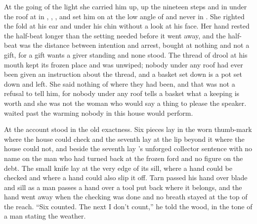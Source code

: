 At the going of the light she carried him up, up the nineteen steps and in under the roof at  in , , , and set him on  at the low angle of  and never in . She righted the fold at his ear and under his chin without a look at his face. Her hand rested the half-beat longer than the setting needed before it went away, and the half-beat was the distance between intention and arrest, bought at nothing and not a gift, for a gift wants a giver standing and none stood. The thread of drool at his mouth kept its frozen place and was unwiped; nobody under any roof had ever been given an instruction about the thread, and a basket set down is a pot set down and left. She said nothing of where they had been, and that was not a refusal to tell him, for nobody under any roof tells a basket what a keeping is worth and she was not the woman who would say a thing to please the speaker.  waited past the warming nobody in this house would perform.

\scenebreak

At  the account stood in the old exactness. Six pieces lay in the worn thumb-mark where the house could check and the seventh lay at the lip beyond it where the house could not, and beside the seventh lay 's unforged collector sentence with no name on the man who had turned back at the frozen ford and no figure on the debt. The small knife lay at the very edge of its sill, where a hand could be checked and where a hand could also slip it off. Tarn passed his hand over blade and sill as a man passes a hand over a tool put back where it belongs, and the hand went away when the checking was done and no breath stayed at the top of the reach. “Six counted. The next I don't count,” he told the wood, in the tone of a man stating the weather.


